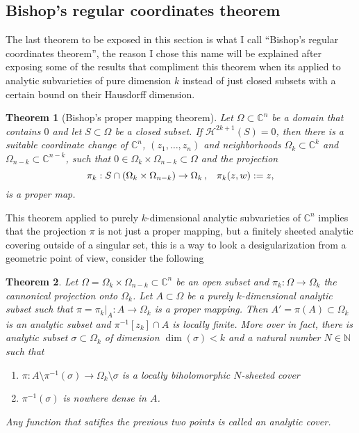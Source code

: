 \documentclass[12pt,twoside,a4paper]{report}
\newtheorem{theorem}{Theorem}[section]
\newcommand{\nat}{\ensuremath{ \mathbb N }}
\newcommand{\co}{\ensuremath{\mathbb C }}
\newcommand{\con}{\ensuremath{\mathbb{C}^n}}
\newcommand{\om}{\ensuremath{\Omega}}
\begin{document}
\subsection{Bishop's regular coordinates theorem}
\noindent The last theorem to be exposed in this section is what I call ``Bishop's regular coordinates theorem'', the reason I chose this name will be explained after exposing some of the results that compliment this theorem when its applied to analytic subvarieties of pure dimension $k$ instead of just closed subsets with a certain bound on their Hausdorff dimension.
\begin{theorem}[Bishop's proper mapping theorem]\label{bishop mapping}
  Let $\om\subset\con$ be a domain that contains $0$ and let $S\subset\om$ be a closed subset. If $\mathcal{H}^{2k+1}(S)=0$, then there is a suitable coordinate change of $\con$, $(z_1,\ldots,z_n)$ and neighborhoods $\om_k\subset\co^k$ and $\om_{n-k}\subset\co^{n-k}$, such that $0\in\om_k\times\om_{n-k}\subset\om$ and the projection
        \[
          \pi_k:S\cap(\om_k\times\om_{n-k})\rightarrow\om_k\, ,\hspace{0.3cm}\pi_k(z,w):=z,
        \]
        \noindent is a proper map.
\end{theorem}\label{analytic-cover}
\noindent This theorem applied to purely $k$-dimensional analytic subvarieties of $\con$ implies that the projection $\pi$ is not just a proper mapping, but a finitely sheeted analytic covering outside of a singular set, this is a way to look a desigularization from a geometric point of view, consider the following
\begin{theorem}
  Let $\om=\om_{k}\times\om_{n-k}\subset\con$ be an open subset and $\pi_{k}:\om\rightarrow\om_{k}$ the cannonical projection onto $\om_{k}$. Let $A\subset\om$ be a purely $k$-dimensional analytic subset such that $\pi=\pi_{k}\vert_{A}:A\rightarrow\om_{k}$ is a proper mapping. Then $A'=\pi(A)\subset\om_{k}$ is an analytic subset and $\pi^{-1}[z_{k}]\cap A$ is locally finite. More over in fact, there is analytic subset $\sigma\subset\om_{k}$ of dimension $\dim(\sigma)<k$ and a natural number $N\in\nat$ such that
  \begin{enumerate}
    \item $\pi:A\setminus\pi^{-1}(\sigma)\to\om_{k}\setminus\sigma$ is a locally biholomorphic $N$-sheeted cover
    \item $\pi^{-1}(\sigma)$ is nowhere dense in $A$.
  \end{enumerate}
  Any function that satifies the previous two points is called an \emph{analytic cover}.
\end{theorem}
\end{document}
